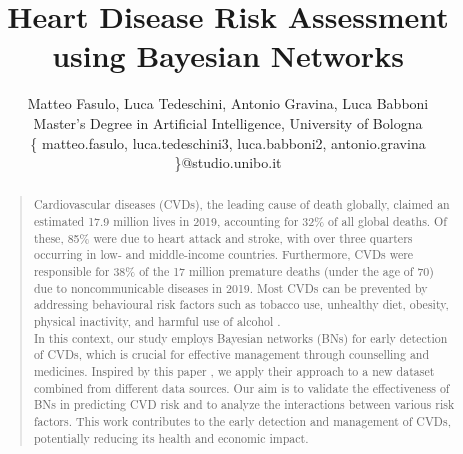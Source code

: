 \documentclass[letterpaper]{article}
\begin{document}
%
\title{Heart Disease Risk Assessment using Bayesian Networks}
\author{Matteo Fasulo, Luca Tedeschini, Antonio Gravina, Luca Babboni\\
Master's Degree in Artificial Intelligence, University of Bologna\\
\{ matteo.fasulo, luca.tedeschini3, luca.babboni2, antonio.gravina \}@studio.unibo.it
}

\maketitle



\begin{abstract}
\begin{quote}


Cardiovascular diseases (CVDs), the leading cause of death globally, claimed an estimated 17.9 million lives in 2019, accounting for 32\% of all global deaths. Of these, 85\% were due to heart attack and stroke, with over three quarters occurring in low- and middle-income countries. Furthermore, CVDs were responsible for 38\% of the 17 million premature deaths (under the age of 70) due to noncommunicable diseases in 2019. Most CVDs can be prevented by addressing behavioural risk factors such as tobacco use, unhealthy diet, obesity, physical inactivity, and harmful use of alcohol \cite{WHO2024}. \\
In this context, our study employs Bayesian networks (BNs) for early detection of CVDs, which is crucial for effective management through counselling and medicines. Inspired by this paper \cite{ORDOVAS2023107405}, we apply their approach to a new dataset combined from different data sources. Our aim is to validate the effectiveness of BNs in predicting CVD risk and to analyze the interactions between various risk factors. This work contributes to the early detection and management of CVDs, potentially reducing its health and economic impact.

\end{quote}
\end{abstract}
\end{document}

